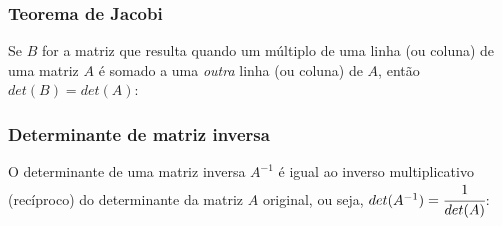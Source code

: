 \documentclass[pdftex, brazil]{beamer}
\begin{document}
\begin{frame}[t]
  \frametitle{Teorema de Jacobi}
  Se $B$ for a matriz que resulta quando um múltiplo de uma linha (ou coluna) de
  uma matriz $A$ é somado a uma \emph{outra} linha (ou coluna) de $A$, então
  $det(B) = det(A)$:


\end{frame}

\begin{frame}[t]
  \frametitle{Determinante de matriz inversa}
  O determinante de uma matriz inversa $A^{-1}$ é igual ao inverso
  multiplicativo (recíproco) do determinante da matriz $A$ original, ou seja,
  $det(A^{-1}) = \cfrac{1}{det(A)}$:

\end{frame}
\end{document}
